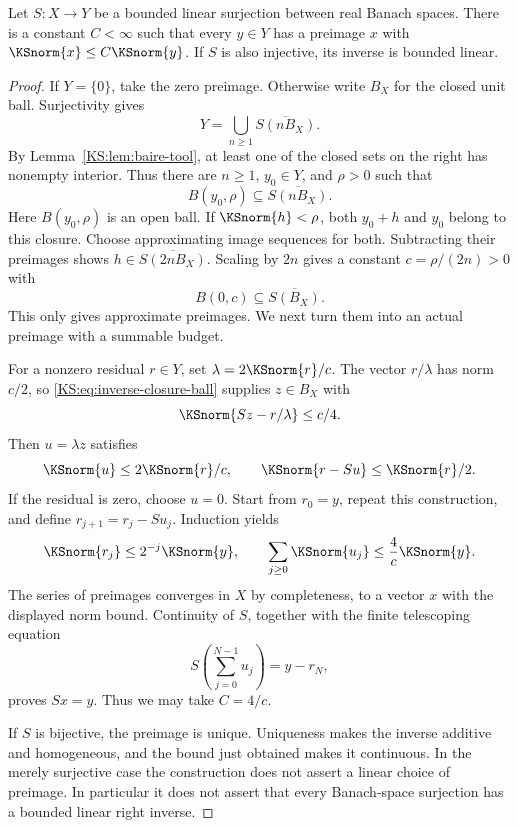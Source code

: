 \documentclass[11pt,oneside,openany]{book}
\numberwithin{equation}{section}
\begin{document}
\begin{KSlemma}\label{KS:lem:inverse-tool}
Let \(S:X\to Y\) be a bounded linear surjection between real Banach spaces. There is a constant \(C<\infty\) such that every \(y\in Y\) has a preimage \(x\) with \(\KSnorm{x}\le C\KSnorm{y}\). If \(S\) is also injective, its inverse is bounded linear.
\end{KSlemma}
\begin{proof}
If \(Y=\{0\}\), take the zero preimage. Otherwise write \(B_X\) for the closed unit ball. Surjectivity gives
\[
 Y=\bigcup_{n\ge1}\overline{S(nB_X)}.
\]
By Lemma~\ref{KS:lem:baire-tool}, at least one of the closed sets on the right has nonempty interior. Thus there are \(n\ge1\), \(y_0\in Y\), and \(\rho>0\) such that
\[
 B(y_0,\rho)\subseteq\overline{S(nB_X)}.
\]
Here \(B(y_0,\rho)\) is an open ball. If \(\KSnorm{h}<\rho\), both \(y_0+h\) and \(y_0\) belong to this closure. Choose approximating image sequences for both. Subtracting their preimages shows \(h\in\overline{S(2nB_X)}\). Scaling by \(2n\) gives a constant \(c=\rho/(2n)>0\) with
\begin{equation}\label{KS:eq:inverse-closure-ball}
 B(0,c)\subseteq\overline{S(B_X)}.
\end{equation}
This only gives approximate preimages. We next turn them into an actual preimage with a summable budget.

For a nonzero residual \(r\in Y\), set \(\lambda=2\KSnorm{r}/c\). The vector \(r/\lambda\) has norm \(c/2\), so \eqref{KS:eq:inverse-closure-ball} supplies \(z\in B_X\) with
\[
 \KSnorm{Sz-r/\lambda}\le c/4.
\]
Then \(u=\lambda z\) satisfies
\[
 \KSnorm{u}\le 2\KSnorm{r}/c,\qquad
 \KSnorm{r-Su}\le\KSnorm{r}/2.
\]
If the residual is zero, choose \(u=0\). Start from \(r_0=y\), repeat this construction, and define \(r_{j+1}=r_j-Su_j\). Induction yields
\[
 \KSnorm{r_j}\le2^{-j}\KSnorm{y},\qquad
 \sum_{j\ge0}\KSnorm{u_j}\le\frac{4}{c}\KSnorm{y}.
\]
The series of preimages converges in \(X\) by completeness, to a vector \(x\) with the displayed norm bound. Continuity of \(S\), together with the finite telescoping equation
\[
 S\left(\sum_{j=0}^{N-1}u_j\right)=y-r_N,
\]
proves \(Sx=y\). Thus we may take \(C=4/c\).

If \(S\) is bijective, the preimage is unique. Uniqueness makes the inverse additive and homogeneous, and the bound just obtained makes it continuous. In the merely surjective case the construction does not assert a linear choice of preimage. In particular it does not assert that every Banach-space surjection has a bounded linear right inverse.
\end{proof}
\end{document}
